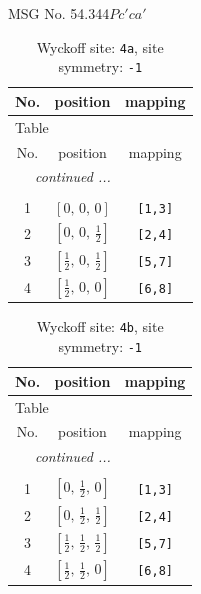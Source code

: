 \documentclass[fleqn,8pt]{jsarticle}
\begin{document}
\setcounter{MaxMatrixCols}{32}

\renewcommand{\tablename}{Table~}
\renewcommand{\figurename}{Figure~}
\begin{center}
\LARGE
MSG No. 54.344\quad$Pc'ca'$
\end{center}
\renewcommand{\arraystretch}{1.2}
\begin{longtable}{ccc}
\caption{Wyckoff site: {\tt 4a}, site symmetry: {\tt -1}}
 \\
 \hline \hline
No. & position & mapping \\ \hline \endfirsthead

\multicolumn{2}{l}{\tablename\ \thetable{}} \\
 \hline \hline
No. & position & mapping \\ \hline \endhead

 \hline \hline
\multicolumn{2}{r}{\footnotesize\it continued ...} \\ \endfoot

 \hline \hline
\multicolumn{2}{r}{} \\ \endlastfoot

1 & $\left[ 0,\, 0,\, 0 \right]$ & {\tt [1,3]} \\ \hline
2 & $\left[ 0,\, 0,\, \frac{1}{2} \right]$ & {\tt [2,4]} \\ \hline
3 & $\left[ \frac{1}{2},\, 0,\, \frac{1}{2} \right]$ & {\tt [5,7]} \\ \hline
4 & $\left[ \frac{1}{2},\, 0,\, 0 \right]$ & {\tt [6,8]} \\
\end{longtable}
\renewcommand{\arraystretch}{1.2}
\begin{longtable}{ccc}
\caption{Wyckoff site: {\tt 4b}, site symmetry: {\tt -1}}
 \\
 \hline \hline
No. & position & mapping \\ \hline \endfirsthead

\multicolumn{2}{l}{\tablename\ \thetable{}} \\
 \hline \hline
No. & position & mapping \\ \hline \endhead

 \hline \hline
\multicolumn{2}{r}{\footnotesize\it continued ...} \\ \endfoot

 \hline \hline
\multicolumn{2}{r}{} \\ \endlastfoot

1 & $\left[ 0,\, \frac{1}{2},\, 0 \right]$ & {\tt [1,3]} \\ \hline
2 & $\left[ 0,\, \frac{1}{2},\, \frac{1}{2} \right]$ & {\tt [2,4]} \\ \hline
3 & $\left[ \frac{1}{2},\, \frac{1}{2},\, \frac{1}{2} \right]$ & {\tt [5,7]} \\ \hline
4 & $\left[ \frac{1}{2},\, \frac{1}{2},\, 0 \right]$ & {\tt [6,8]} \\
\end{longtable}
\end{document}
